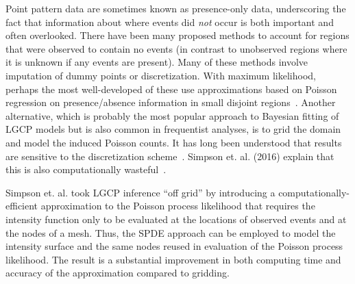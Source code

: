 \documentclass[]{interact}
\begin{document}
Point pattern data are sometimes known as presence-only data, underscoring
the fact that information about where events did \emph{not} occur is both
important and often overlooked. There have been many proposed methods to
account for regions that were observed to contain no events (in contrast to
unobserved regions where it is unknown if any events are present). Many of
these methods involve imputation of dummy points or discretization. With maximum likelihood, perhaps the most well-developed of these use
approximations based on Poisson regression on presence/absence information in
small disjoint regions~\cite{bermanturner,baddeleyturner}. Another alternative, 
which is probably the most popular approach to Bayesian
fitting of LGCP models but is also common in frequentist analyses, is to grid
the domain and model the induced Poisson counts. It has long been understood
that results are sensitive to the discretization scheme~\cite{brixmoeller}.
Simpson et. al. (2016) explain that this is also computationally
wasteful~\cite{simpsonetal}.

Simpson et. al. took LGCP inference ``off grid'' by introducing a
computationally-efficient approximation to the Poisson process likelihood that
requires the intensity function only to be evaluated at the locations of
observed events and at the nodes of a mesh. Thus, the SPDE approach can be
employed to model the intensity surface and the same nodes reused in
evaluation of the Poisson process likelihood. The result is a substantial
improvement in both computing time and accuracy of the approximation compared
to gridding.
\end{document}

